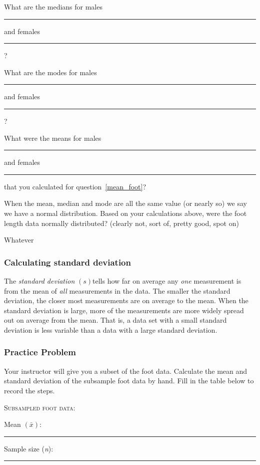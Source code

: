 \documentclass[12pt, addpoints, hidelinks]{exam}
\newcommand*\AnswerBox[2]{%
    \parbox[t][#1]{0.92\textwidth}{%
    \begin{solution}#2\end{solution}}
}
\begin{document}
\begin{questions}
\question
What are the medians for males \rule{1in}{0.4pt} and
females \rule{1in}{0.4pt}?

\vspace*{0.5\baselineskip}

\question
What are the modes for males \rule{1in}{0.4pt} and
females \rule{1in}{0.4pt}?

\vspace*{0.5\baselineskip}

\question
What were the means for males \rule{1in}{0.4pt} and
females \rule{1in}{0.4pt} that you calculated for question~\ref{mean_foot}?



\question
When the mean, median and mode are all the same value (or nearly
so) we say we have a normal distribution. Based on your calculations above, were the foot length data normally distributed? (clearly not,
sort of, pretty good, spot on)

\AnswerBox{1\baselineskip}{Whatever}

\subsubsection*{Calculating standard deviation}

The \emph{standard deviation} $(s)$tells how far on average any \emph{one} measurement
is from the mean of \emph{all} measurements in the data. The smaller the standard deviation, the closer most
measurements are on average to the mean. When the standard deviation is large,
more of the measurements are more widely spread out on average from the mean. That is, a data set with a small standard deviation is less variable than a data with a large standard deviation.

\subsubsection*{Practice Problem}

Your instructor will give you a subset of the foot data. Calculate the mean and standard deviation of the
subsample foot data by hand. Fill in the table below to record the steps.

\newpage


\textsc{Subsampled foot data:}

\question
Mean $(\bar{x})$: \rule{1in}{0.4pt} \hspace*{0.5in} Sample size (\emph{n}): \rule{1in}{0.4pt}


\end{questions}
\end{document}
